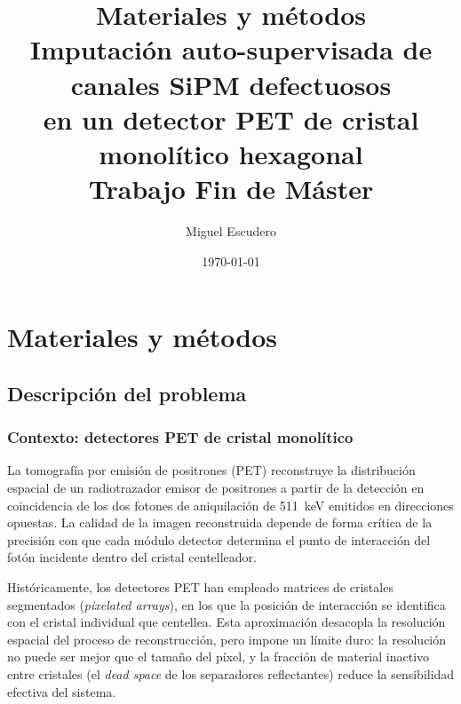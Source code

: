 \title{%
    \vspace*{2cm}
    {\Huge\bfseries Materiales y métodos}\\[1.2cm]
    {\Large Imputación auto-supervisada de canales SiPM defectuosos\\
     en un detector PET de cristal monolítico hexagonal}\\[0.8cm]
    {\large Trabajo Fin de Máster}
}
\author{Miguel Escudero}
\date{\today}



\maketitle
\tableofcontents
\listoftables
\listoffigures
\cleardoublepage

\chapter{Materiales y métodos}
\label{cap:materiales-metodos}

\section{Descripción del problema}
\label{sec:descripcion-problema}

\subsection{Contexto: detectores PET de cristal monolítico}
\label{subsec:contexto-pet}

La tomografía por emisión de positrones (PET) reconstruye la distribución espacial de un
radiotrazador emisor de positrones a partir de la detección en coincidencia de los dos fotones
de aniquilación de \SI{511}{\kilo\electronvolt} emitidos en direcciones opuestas. La calidad de
la imagen reconstruida depende de forma crítica de la precisión con que cada módulo detector
determina el punto de interacción del fotón incidente dentro del cristal centelleador.

Históricamente, los detectores PET han empleado matrices de cristales segmentados (\emph{pixelated
arrays}), en los que la posición de interacción se identifica con el cristal individual que
centellea. Esta aproximación desacopla la resolución espacial del proceso de reconstrucción, pero
impone un límite duro: la resolución no puede ser mejor que el tamaño del píxel, y la fracción de
material inactivo entre cristales (el \emph{dead space} de los separadores reflectantes) reduce la
sensibilidad efectiva del sistema.

